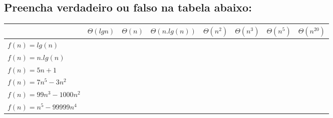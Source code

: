 \documentclass[12pt]{article}
\begin{document}
{\subsection{Preencha verdadeiro ou falso na tabela abaixo:}
\begin{table}[htb]
    \begin{tabular}{|l|l|l|l|l|l|l|l|} \hline
                              & $\Theta(lg n)$ & $\Theta(n)$ & $\Theta(n.lg(n))$ & $\Theta(n^2)$ & $\Theta(n^3)$ & $\Theta(n^5)$ & $\Theta(n^20)$ \\ \hline
    $f(n) = lg(n)$            &                &             &                   &               &               &               &                \\ \hline
    $f(n) = n . lg(n)$        &                &             &                   &               &               &               &                \\ \hline
    $f(n) = 5n + 1$           &                &             &                   &               &               &               &                \\ \hline
    $f(n) = 7n^5 - 3n^2$      &                &             &                   &               &               &               &                \\ \hline
    $f(n) = 99n^3 - 1000n^2$  &                &             &                   &               &               &               &                \\ \hline
    $f(n) = n^5 - 99999n^4$   &                &             &                   &               &               &               &                \\ \hline
    \end{tabular}
\end{table}

}
\end{document}
